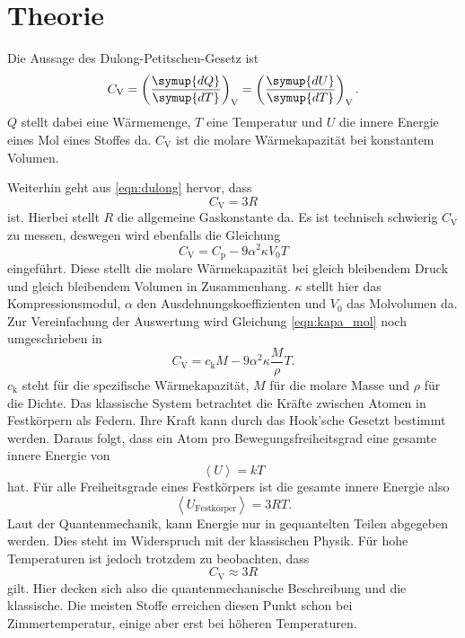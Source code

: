 \section{Theorie}
\label{sec:Theorie}

Die Aussage des Dulong-Petitschen-Gesetz ist
\begin{equation}
    C_\text{V} = \left ( \frac{\symup{dQ}}{\symup{dT}} \right )_\text{V} = \left ( \frac{\symup{dU}}{\symup{dT}} \right )_\text{V}  .
    \label{eqn:dulong}
\end{equation}
$Q$ stellt dabei eine Wärmemenge, $T$ eine Temperatur und $U$ die innere Energie eines Mol eines Stoffes da.
$C_\text{V}$ ist die molare Wärmekapazität bei konstantem Volumen.

Weiterhin geht aus \eqref{eqn:dulong} hervor, dass
\begin{equation}
    C_\text{V} = 3R
    \label{eqn:dulong_klassisch}
\end{equation}
ist. Hierbei stellt $R$ die allgemeine Gaskonstante da.
Es ist technisch schwierig $C_\text{V}$ zu messen, deswegen wird ebenfalls die Gleichung
\begin{equation}
    C_\text{V} = C_\text{p} - 9 \alpha^2 \kappa V_0 T
    \label{eqn:kapa_mol}
\end{equation}
eingeführt.
Diese stellt die molare Wärmekapazität bei gleich bleibendem Druck und gleich bleibendem Volumen in Zusammenhang.
$\kappa$ stellt hier das Kompressionsmodul, $\alpha$ den Ausdehnungskoeffizienten und $V_0$ das Molvolumen da.
Zur Vereinfachung der Auswertung wird Gleichung \eqref{eqn:kapa_mol} noch umgeschrieben in
\begin{equation}
    C_\text{V} = c_\text{k} M - 9\alpha^2 \kappa \frac{M}{\rho}T.
    \label{eqn:waerme_vol}
\end{equation}
$c_\text{k}$ steht für die spezifische Wärmekapazität, $M$ für die molare Masse und $\rho$ für die Dichte.
Das klassische System betrachtet die Kräfte zwischen Atomen in Festkörpern als Federn.
Ihre Kraft kann durch das Hook'sche Gesetzt bestimmt werden.
Daraus folgt, dass ein Atom pro Bewegungsfreiheitsgrad eine gesamte innere Energie von
\begin{equation*}
    \left < U \right > = kT
\end{equation*}
hat.
Für alle Freiheitsgrade eines Festkörpers ist die gesamte innere Energie also
\begin{equation*}
    \left < U_\text{Festkörper} \right > = 3RT.
\end{equation*}
Laut der Quantenmechanik, kann Energie nur in gequantelten Teilen abgegeben werden.
Dies steht im Widerspruch mit der klassischen Physik.
Für hohe Temperaturen ist jedoch trotzdem zu beobachten, dass 
\begin{equation*}
    C_\text{V} \approx 3 R
\end{equation*}
gilt.
Hier decken sich also die quantenmechanische Beschreibung und die klassische.
Die meisten Stoffe erreichen diesen Punkt schon bei Zimmertemperatur, einige aber erst bei höheren Temperaturen.

